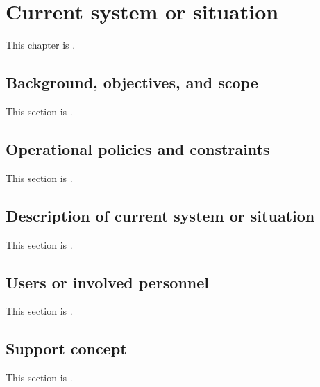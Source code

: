 
\chapter{Current system or situation}
\label{loc:Current System or Situation}


This chapter is \TBD.


\section{Background, objectives, and scope}
\label{loc:Background, Objectives, and Scope}


This section is \TBD.


\section{Operational policies and constraints}
\label{loc:Operational Policies and Constraints}


This section is \TBD.


\section{Description of current system or situation}
\label{loc:Description of current system or situation}


This section is \TBD.


\section{Users or involved personnel}
\label{loc:Users or involved personnel}


This section is \TBD.


\section{Support concept}
\label{loc:Support concept}


This section is \TBD.
